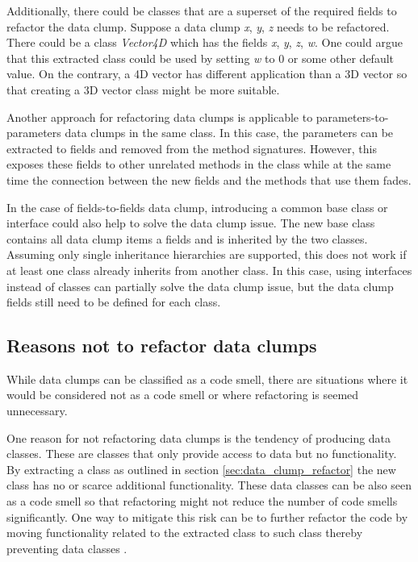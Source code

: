 Additionally, there could be classes that are a superset of the required fields to refactor the data clump. Suppose a data clump \textit{x}, \textit{y}, \textit{z} needs to be refactored. There could be a  class \textit{Vector4D} which has the fields  \textit{x}, \textit{y}, \textit{z}, \textit{w}. One could argue that this extracted class could be used by setting \textit{w} to 0 or some other default value. On the contrary, a 4D vector has different application than a 3D vector so that creating a 3D vector class might be more suitable. 

Another approach for refactoring data clumps is applicable to parameters-to-parameters data clumps in the same class. In this case, the parameters can be extracted to fields and removed from the method signatures. However, this exposes these fields to other unrelated methods in the class while at the same time the connection between the new fields and the methods that use them fades.


In the case of fields-to-fields data clump, introducing a common base class or interface could also help to solve the data clump issue. The new base class contains all data clump items a fields and is inherited by the two classes. Assuming only single inheritance hierarchies are supported, this does not work if at least one class already inherits from another class. In this case, using interfaces instead of classes can partially solve the data clump issue, but the data clump fields still need to be defined for each class.





\subsection{Reasons not to refactor data clumps}\label{sec:data_clump_not_refactor}
While data clumps can be classified as a code smell, there are situations where it would be considered not as a code smell or where refactoring is seemed unnecessary. 


One reason for not refactoring data clumps is the tendency of producing data classes. These are classes that only provide access to data but no functionality. By extracting a class as outlined in section \ref{sec:data_clump_refactor} the new class has no or scarce additional functionality. These data classes can be also seen as a code smell so that refactoring might not reduce the number of code smells significantly. One way to mitigate this risk can be to further refactor the code by moving functionality related to the extracted class to such class thereby preventing data classes \cite{fowler2019refactoring}. 


